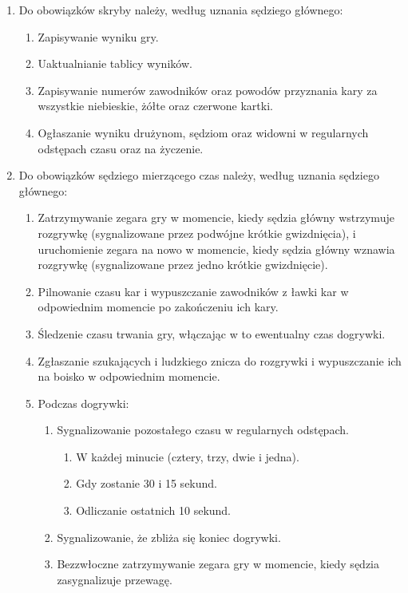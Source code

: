 \documentclass[12pt]{article}
\begin{document}
\begin{enumerate}
\item
    Do obowiązków skryby należy, według uznania sędziego głównego:
  
  \begin{enumerate}
  \item
        Zapisywanie wyniku gry.
      \item
        Uaktualnianie tablicy wyników.
      \item
        Zapisywanie numerów zawodników oraz powodów przyznania kary za
    wszystkie niebieskie, żółte oraz czerwone kartki.
      \item
        Ogłaszanie wyniku drużynom, sędziom oraz widowni w regularnych
    odstępach czasu oraz na życzenie.
      \end{enumerate}
\item
    Do obowiązków sędziego mierzącego czas należy, według uznania sędziego
  głównego:
  
  \begin{enumerate}
  \item
        Zatrzymywanie zegara gry w momencie, kiedy sędzia główny wstrzymuje
    rozgrywkę (sygnalizowane przez podwójne krótkie gwizdnięcia), i
    uruchomienie zegara na nowo w momencie, kiedy sędzia główny wznawia
    rozgrywkę (sygnalizowane przez jedno krótkie gwizdnięcie).
      \item
        Pilnowanie czasu kar i wypuszczanie zawodników z ławki kar w
    odpowiednim momencie po zakończeniu ich kary.
      \item
        Śledzenie czasu trwania gry, włączając w to ewentualny czas
    dogrywki.
      \item
        Zgłaszanie szukających i ludzkiego znicza do rozgrywki i
    wypuszczanie ich na boisko w odpowiednim momencie.
      \item
        Podczas dogrywki:
    
    \begin{enumerate}
    \item
            Sygnalizowanie pozostałego czasu w regularnych odstępach.
      
      \begin{enumerate}
      \item
                W każdej minucie (cztery, trzy, dwie i jedna).
              \item
                Gdy zostanie 30 i 15 sekund.
              \item
                Odliczanie ostatnich 10 sekund.
              \end{enumerate}
    \item
            Sygnalizowanie, że zbliża się koniec dogrywki.
          \item
            Bezzwłoczne zatrzymywanie zegara gry w momencie, kiedy sędzia
      zasygnalizuje przewagę.
          \end{enumerate}
  \end{enumerate}
\end{enumerate}
\end{document}
